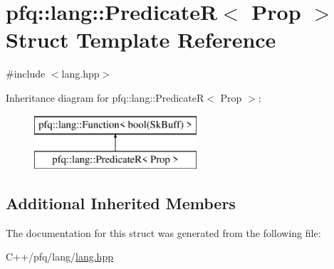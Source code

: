 \hypertarget{structpfq_1_1lang_1_1PredicateR}{\section{pfq\+:\+:lang\+:\+:Predicate\+R$<$ Prop $>$ Struct Template Reference}
\label{structpfq_1_1lang_1_1PredicateR}
}


{\ttfamily \#include $<$lang.\+hpp$>$}

Inheritance diagram for pfq\+:\+:lang\+:\+:Predicate\+R$<$ Prop $>$\+:\begin{figure}[H]
\begin{center}
\leavevmode
\includegraphics[height=2.000000cm]{structpfq_1_1lang_1_1PredicateR}
\end{center}
\end{figure}
\subsection*{Additional Inherited Members}


The documentation for this struct was generated from the following file\+:\begin{DoxyCompactItemize}
\item 
C++/pfq/lang/\hyperlink{lang_8hpp}{lang.\+hpp}\end{DoxyCompactItemize}
